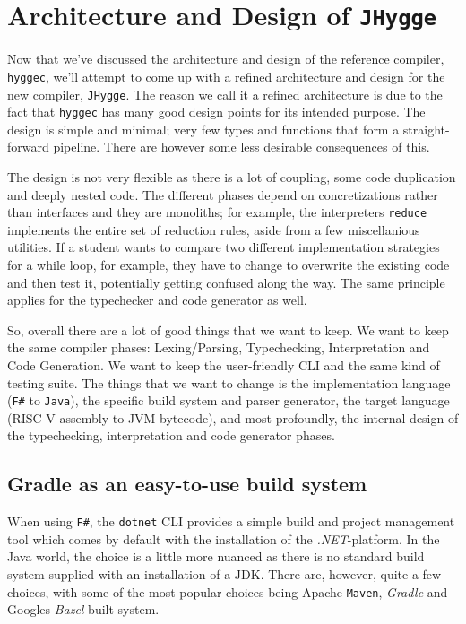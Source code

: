 \chapter{Architecture and Design of \texttt{JHygge}}\label{sec:architecture}

Now that we've discussed the architecture and design of the reference compiler, \texttt{hyggec}, we'll attempt to come up with
a refined architecture and design for the new compiler, \texttt{JHygge}. The reason we call it a refined architecture is due to
the fact that \texttt{hyggec} has many good design points for its intended purpose. The design is simple and minimal; very
few types and functions that form a straight-forward pipeline. There are however some less desirable consequences of this.

The design is not very flexible as there is a lot of coupling, some code duplication and deeply nested code. The different
phases depend on concretizations rather than interfaces and they are monoliths; for example, the interpreters \texttt{reduce}
implements the entire set of reduction rules, aside from a few miscellanious utilities. If a student wants to compare two different
implementation strategies for a while loop, for example, they have to change to overwrite the existing code and then test it,
potentially getting confused along the way. The same principle applies for the typechecker and code generator as well.

So, overall there are a lot of good things that we want to keep. We want to keep the same compiler phases: Lexing/Parsing, Typechecking,
Interpretation and Code Generation. We want to keep the user-friendly CLI and the same kind of testing suite. The things that we
want to change is the implementation language (\texttt{F\#} to \texttt{Java}), the specific build system and parser generator,
the target language (RISC-V assembly to JVM bytecode), and most profoundly, the internal design of the typechecking, interpretation
and code generator phases.

\section{Gradle as an easy-to-use build system}

When using \texttt{F\#}, the \texttt{dotnet} CLI provides a simple build and project management tool which comes by default
with the installation of the \textit{.NET}-platform. In the Java world, the choice is a little more nuanced as there is
no standard build system supplied with an installation of a JDK. There are, however, quite a few choices, with some of the
most popular choices being Apache \texttt{Maven}, \textit{Gradle} and Googles \textit{Bazel} built system.

